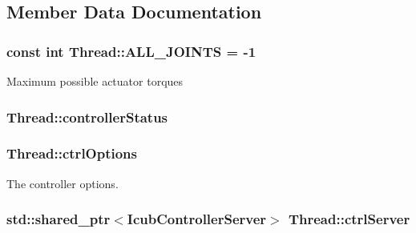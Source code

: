 \subsection{\-Member \-Data \-Documentation}
\hypertarget{classThread_a875b3311a39e3b87dbc981f2db7b1b9d}{
\subsubsection[{\-A\-L\-L\-\_\-\-J\-O\-I\-N\-T\-S}]{\setlength{\rightskip}{0pt plus 5cm}const int {\bf \-Thread\-::\-A\-L\-L\-\_\-\-J\-O\-I\-N\-T\-S} = -\/1}}\label{classThread_a875b3311a39e3b87dbc981f2db7b1b9d}
\-Maximum possible actuator torques \hypertarget{classThread_a913cf23e86cdaefd036b782f7417254d}{
\subsubsection[{controller\-Status}]{ {\bf \-Thread\-::controller\-Status}}}\label{classThread_a913cf23e86cdaefd036b782f7417254d}
\hypertarget{classThread_af96a166364f0c6a680115600b3bd232e}{
\subsubsection[{ctrl\-Options}]{ {\bf \-Thread\-::ctrl\-Options}}}\label{classThread_af96a166364f0c6a680115600b3bd232e}
\-The controller options. \hypertarget{classThread_ace1179249de64e545f43dc48529fbbb6}{
\subsubsection[{ctrl\-Server}]{\setlength{\rightskip}{0pt plus 5cm}std\-::shared\-\_\-ptr$<${\bf \-Icub\-Controller\-Server}$>$ {\bf \-Thread\-::ctrl\-Server}}}\label{classThread_ace1179249de64e545f43dc48529fbbb6}
